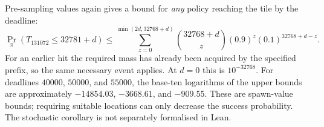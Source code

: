 Pre-sampling values again gives a bound for \emph{any} policy reaching
the tile by the deadline:
\[
\Pr_\pi(T_{131072}\le32781+d)
\le \sum_{z=0}^{\min(2d,32768+d)}
 \binom{32768+d}{z}(0.9)^z(0.1)^{32768+d-z}.
\]
For an earlier hit the required mass has already been acquired by the
specified prefix, so the same necessary event applies. At $d=0$ this
is $10^{-32768}$. For deadlines $40000$, $50000$, and $55000$, the
base-ten logarithms of the upper bounds are approximately
$-14854.03$, $-3668.61$, and $-909.55$. These are spawn-value bounds;
requiring suitable locations can only decrease the success probability.
The stochastic corollary is not separately formalised in Lean.
